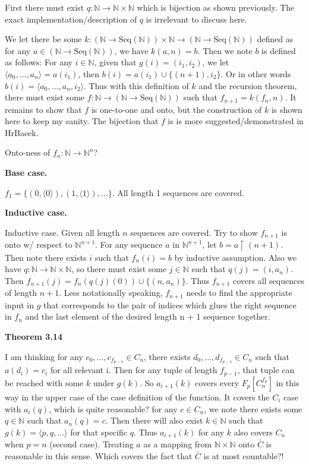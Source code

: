 \documentclass{article}
\begin{document}
\medskip
First there must exist $q: \mathbb{N} \xrightarrow{}\mathbb{N} \times \mathbb{N}$ which is bijection as shown previously. The exact implementation/description of $q$ is irrelevant to discuss here.

\medskip
We let there be some $k: (\mathbb{N} \xrightarrow{} \text{Seq}(\mathbb{N})) \times \mathbb{N} \xrightarrow{} (\mathbb{N} \xrightarrow{} \text{Seq}(\mathbb{N}))$ defined as for any $a \in (\mathbb{N} \xrightarrow{} \text{Seq}(\mathbb{N}))$, we have $k(a, n) = b$. Then we note $b$ is defined as follows: For any $i \in \mathbb{N}$, given that $g(i) = (i_1, i_2)$, we let $\langle a_0, ..., a_n \rangle = a(i_1)$, then $b(i) = a(i_1) \cup \{(n + 1), i_2\}$. Or in other words $b(i) = \langle a_0, ..., a_n, i_2 \rangle$. Thus with this definition of $k$ and the recursion theorem, there must exist some $f: \mathbb{N} \xrightarrow{} (\mathbb{N} \xrightarrow{} \text{Seq}(\mathbb{N}))$ such that $f_{n + 1} = k(f_n, n)$. It remains to show that $f$ is one-to-one and onto, but the construction of $k$ is shown here to keep my sanity. The bijection that $f$ is is more suggested/demonstrated in HrBacek.

\newpage
Onto-ness of $f_n: \mathbb{N} \xrightarrow{} \mathbb{N}^n$?

\medskip
\textbf{Base case.}
\medskip

 $f_1 = \{(0, \langle 0 \rangle),(1, \langle 1 \rangle),...\}$. All length 1 sequences are covered.

\medskip
\textbf{Inductive case.}
\medskip

Inductive case. Given all length $n$ sequences are covered. Try to show $f_{n + 1}$ is onto w/ respect to $\mathbb{N}^{n + 1}$. For any sequence $a$ in $\mathbb{N}^{n + 1}$, let $b = a \upharpoonright (n + 1)$. Then note there exists $i$ such that $f_n(i) = b$ by inductive assumption. Also we have $q: \mathbb{N} \xrightarrow{} \mathbb{N} \times \mathbb{N}$, so there must exist some $j \in \mathbb{N}$ such that $q(j) = (i, a_{n})$. Then $f_{n + 1}(j) = f_n(q(j)(0)) \cup \{(n, a_{n})\}$. Thus $f_{n + 1}$ covers all sequences of length $n + 1$. Less notationally speaking, $f_{n + 1}$ needs to find the appropriate input in $g$ that corresponds to the pair of indices which glues the right sequence in $f_{n}$ and the last element of the desired length n + 1 sequence together.

\medskip
\textbf{Theorem 3.14}
\medskip

I am thinking for any $c_0, ..., c_{f_{p - 1}} \in C_{n}$, there exists $d_0, ..., d_{f_{p - 1}} \in C_{n}$ such that $a(d_i) = c_i$ for all relevant i. Then for any tuple of length $f_{p - 1}$, that tuple can be reached with some $k$ under $g(k)$. So $a_{i + 1}(k)$ covers every $F_p[C_{n}^{f_p}]$ in this way in the upper case of the case definition of the function. It covers the $C_i$ case with $a_i(q)$, which is quite reasonable? for any $c \in C_{n}$, we note there exists some $q \in \mathbb{N}$ such that $a_n(q) = c$. Then there will also exist $k \in \mathbb{N}$ such that $g(k) = \langle p, q, ...\rangle$ for that specific $q$. Thus $a_{i + 1}(k)$ for any $k$ also covers $C_n$ when $p = n$ (second case). Treating $a$ as a mapping from $\mathbb{N} \times \mathbb{N}$ onto $\bar{C}$ is reasonable in this sense. Which covers the fact that $\bar{C}$ is at most countable?! 
\end{document}

